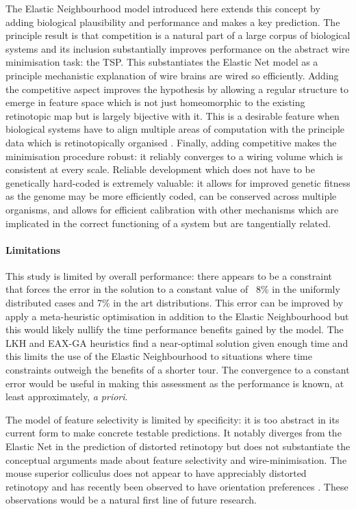The Elastic Neighbourhood model introduced here extends this concept by adding biological plausibility and performance and makes a key prediction. The principle result is that competition is a natural part of a large corpus of biological systems and its inclusion substantially improves performance on the abstract wire minimisation task: the TSP. This substantiates the Elastic Net model as a principle mechanistic explanation of wire brains are wired so efficiently. Adding the competitive aspect improves the hypothesis by allowing a regular structure to emerge in feature space which is not just homeomorphic to the existing retinotopic map but is largely bijective with it. This is a desirable feature when biological systems have to align multiple areas of computation with the principle data which is retinotopically organised \cite{Savier2017-wt}. Finally, adding competitive makes the minimisation procedure robust: it reliably converges to a wiring volume which is consistent at every scale. Reliable development which does not have to be genetically hard-coded is extremely valuable: it allows for improved genetic fitness as the genome may be more efficiently coded, can be conserved across multiple organisms, and allows for efficient calibration with other mechanisms which are implicated in the correct functioning of a system but are tangentially related.

\paragraph{Limitations}
This study is limited by overall performance: there appears to be a constraint that forces the error in the solution to a constant value of ~8\% in the uniformly distributed cases and 7\% in the art distributions. This error can be improved by apply a meta-heuristic optimisation in addition to the Elastic Neighbourhood but this would likely nullify the time performance benefits gained by the model. The LKH and EAX-GA heuristics find a near-optimal solution given enough time and this limits the use of the Elastic Neighbourhood to situations where time constraints outweigh the benefits of a shorter tour. The convergence to a constant error would be useful in making this assessment as the performance is known, at least approximately, \textit{a priori}.

The model of feature selectivity is limited by specificity: it is too abstract in its current form to make concrete testable predictions. It notably diverges from the Elastic Net in the prediction of distorted retinotopy but does not substantiate the conceptual arguments made about feature selectivity and wire-minimisation. The mouse superior colliculus does not appear to have appreciably distorted retinotopy and has recently been observed to have orientation preferences \cite{Feinberg2014-mj}. These observations would be a natural first line of future research.

